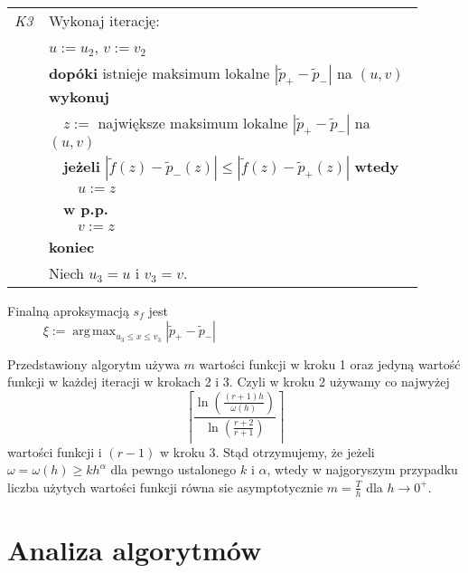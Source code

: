 \documentclass[oik, pdftex, robocza, man]{mgrwms}
\DeclareMathOperator*{\argmax}{arg\,max}
\begin{document}
\begin{tabular}{p{0.045\linewidth} p{0.85\linewidth}}
        \textit{K3} & Wykonaj iterację: \\
                        & $u := u_2$, $v := v_2$ \\
                        & \textbf{dopóki} istnieje maksimum lokalne $|\tilde{p}_{+} - \tilde{p}_{-}|$ na $(u,v)$ \textbf{wykonuj} \\
                        & $\quad$$z :=$ największe maksimum lokalne $|\tilde{p}_{+} - \tilde{p}_{-}|$ na $(u,v)$ \\
                        & $\quad$\textbf{jeżeli} $|\tilde{f}(z) - \tilde{p}_{-}(z)| \leq |\tilde{f}(z) - \tilde{p}_{+}(z)|$ \textbf{wtedy} \\
                        & $\quad\quad$$u:= z$ \\
                        & $\quad$\textbf{w p.p.} \\
                        & $\quad\quad$$v:= z$ \\
                        & \textbf{koniec} \\
                        & Niech $u_3 = u$ i $v_3 = v$.
    \end{tabular} \vspace{10pt}

    Finalną aproksymacją $s_f$ jest
    \begin{equation*}
            \xi := \argmax_{u_3 \leq x \leq v_3}|\tilde{p}_{+} - \tilde{p}_{-}| \hspace{200pt}
    \end{equation*}

    Przedstawiony algorytm używa $m$ wartości funkcji w kroku 1 oraz jedyną wartość funkcji w każdej iteracji w krokach 2 i 3. Czyli w kroku 2 używamy co najwyżej
    \begin{equation*}
        \left\lceil\frac{\ln \left(\frac{(r+1) h}{\omega(h)}\right)}{\ln \left(\frac{r+2}{r+1}\right)}\right\rceil
    \end{equation*}
    wartości funkcji i $(r-1)$ w kroku 3.
    Stąd otrzymujemy, że jeżeli $\omega = \omega(h) \geq kh^{\alpha}$ dla pewngo ustalonego $k$ i $\alpha$, wtedy w najgoryszym przypadku liczba użytych wartości funkcji równa sie asymptotycznie $m = \frac{T}{h}$ dla $h \rightarrow 0^{+}$.


\mgrclosechapter


\chapter{Analiza algorytmów} \label{rozdzial_analiza_alg}
\end{document}
